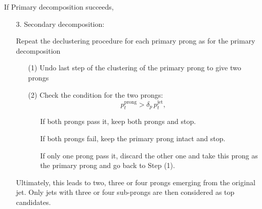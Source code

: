\documentclass[9pt,a4paper,unknownkeysallowed,xcolor=dvipsnames,aspectratio=43]{beamer}
\begin{document}
\begin{frame}\vspace{2mm}

If Primary decomposition succeeds,
\vspace{2mm}
\begin{enumerate}
\item[3.] {\color{darkred} Secondary decomposition}:\\\vspace{2mm}

Repeat the declustering procedure for each primary prong as for
  the primary decomposition
  \vspace{2mm}
\begin{itemize}
    \item[(1)] Undo last step of the clustering of the primary prong to give two prongs
    \vspace{2mm}
    \item[(2)] Check the condition for the two prongs:
     \begin{equation}\label{eq:cms-top-cdt}
    p_t^{\mathrm{prong}} > \delta_p \, p_t^{\text{jet}},
  \end{equation}
    \begin{itemize}
        \item[\diamondsuit] If both prongs pass it, keep both prongs and stop.
        \vspace{2mm}
        \item[\diamondsuit] If both prongs fail, keep the primary prong intact and stop.
        \vspace{2mm}
        \item[\diamondsuit] If only one prong pass it, discard the other one and take this prong as the primary prong and go back to Step (1).
    \end{itemize}
\end{itemize}
\vspace{2mm}
% 
  Ultimately, this leads to two, three or four prongs emerging from
  the original jet. Only jets with three or four sub-prongs are then
  considered as {\color{darkred}top candidates}.

\end{enumerate}
\end{frame}
%
%
\end{document}
